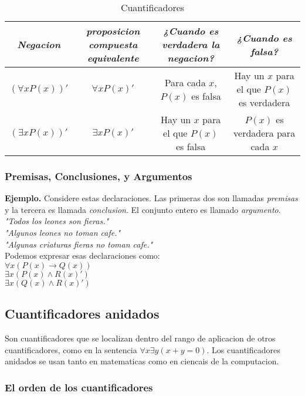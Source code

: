 \documentclass[]{article}
\begin{document}
\begin{table}[H]
	\caption*{Cuantificadores}
	\begin{center}
		\begin{tabular}{|c|c|c|c|}
			\hline
			\textit{Negacion} & \textit{proposicion compuesta equivalente} & \textit{¿Cuando es verdadera la negacion?} & \textit{¿Cuando es falsa?}\\
			\hline
			$(\forall x P(x))'$ & $\forall x P(x)'$ & Para cada $x$, $P(x)$ es falsa & Hay un $x$ para el que $P(x)$ es verdadera\\
			\hline
			$(\exists x P(x))'$ & $\exists x P(x)'$ & Hay un $x$ para el que $P(x)$ es falsa & $P(x)$ es verdadera para cada $x$\\
			\hline
		\end{tabular}
	\end{center}
\end{table}

\subsubsection*{Premisas, Conclusiones, y Argumentos}

\textbf{Ejemplo.} Considere estas declaraciones. Las primeras dos son llamadas \textit{premisas} y la tercera es llamada \textit{conclusion}. El conjunto entero es llamado \textit{argumento}.\\
\textit{"Todos los leones son fieras."}\\
\textit{"Algunos leones no toman cafe."}\\
\textit{"Algunas criaturas fieras no toman cafe."}\\
Podemos expresar esas declaraciones como:\\
$\forall x(P(x) \rightarrow Q(x))$\\
$\exists x(P(x) \wedge R(x)')$\\
$\exists x(Q(x) \wedge R(x)')$\\

\subsection{Cuantificadores anidados}

Son cuantificadores que se localizan dentro del rango de aplicacion de otros cuantificadores, como en la sentencia $\forall x \exists y (x + y = 0)$. Los cuantificadores anidados se usan tanto en matematicas como en ciencais de la computacion. 

\subsubsection*{El orden de los cuantificadores}
\end{document}
